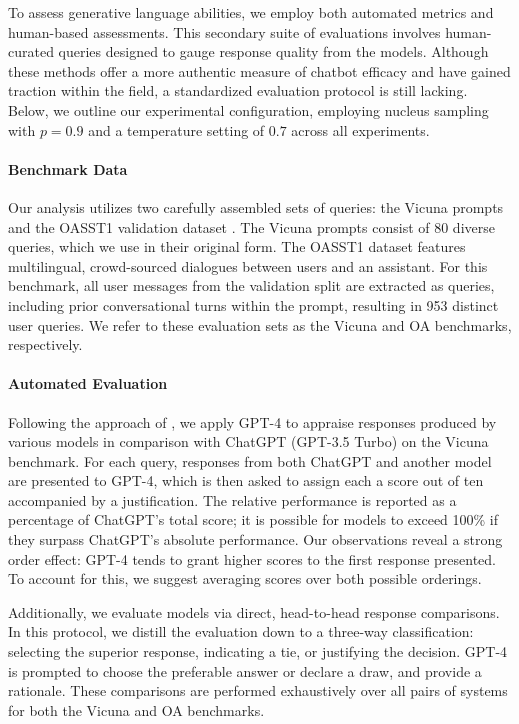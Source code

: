 To assess generative language abilities, we employ both automated metrics and human-based assessments. This secondary suite of evaluations involves human-curated queries designed to gauge response quality from the models. Although these methods offer a more authentic measure of chatbot efficacy and have gained traction within the field, a standardized evaluation protocol is still lacking. Below, we outline our experimental configuration, employing nucleus sampling with $p=0.9$ and a temperature setting of $0.7$ across all experiments.

\paragraph{Benchmark Data} Our analysis utilizes two carefully assembled sets of queries: the Vicuna prompts \citep{vicuna2023} and the OASST1 validation dataset \citep{kopf2023openassistant}. The Vicuna prompts consist of 80 diverse queries, which we use in their original form. The OASST1 dataset features multilingual, crowd-sourced dialogues between users and an assistant. For this benchmark, all user messages from the validation split are extracted as queries, including prior conversational turns within the prompt, resulting in 953 distinct user queries. We refer to these evaluation sets as the Vicuna and OA benchmarks, respectively.

\paragraph{Automated Evaluation} Following the approach of \citet{vicuna2023}, we apply GPT-4 to appraise responses produced by various models in comparison with ChatGPT (GPT-3.5 Turbo) on the Vicuna benchmark. For each query, responses from both ChatGPT and another model are presented to GPT-4, which is then asked to assign each a score out of ten accompanied by a justification. The relative performance is reported as a percentage of ChatGPT’s total score; it is possible for models to exceed 100\% if they surpass ChatGPT’s absolute performance. Our observations reveal a strong order effect: GPT-4 tends to grant higher scores to the first response presented. To account for this, we suggest averaging scores over both possible orderings.

Additionally, we evaluate models via direct, head-to-head response comparisons. In this protocol, we distill the evaluation down to a three-way classification: selecting the superior response, indicating a tie, or justifying the decision. GPT-4 is prompted to choose the preferable answer or declare a draw, and provide a rationale. These comparisons are performed exhaustively over all pairs of systems for both the Vicuna and OA benchmarks.


